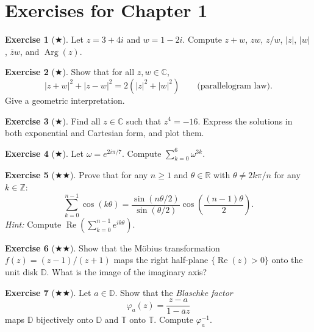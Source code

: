 \documentclass[12pt,a4paper,openany]{book}
\theoremstyle{definition}
\newtheorem{exercise}{Exercise}[chapter]
\theoremstyle{plain}
\theoremstyle{remark}
\newcommand{\C}{\mathbb{C}}
\newcommand{\R}{\mathbb{R}}
\newcommand{\Z}{\mathbb{Z}}
\newcommand{\D}{\mathbb{D}}
\newcommand{\T}{\mathbb{T}}
\DeclareMathOperator{\re}{Re}
\DeclareMathOperator{\Arg}{Arg}
\newcommand{\abs}[1]{\left|#1\right|}
\newcommand{\conj}[1]{\overline{#1}}
\begin{document}
\section{Exercises for Chapter 1}
\label{sec:exercises-ch1}

\begin{exercise}[$\bigstar$]
\label{exo:ch1-1}
Let $z=3+4i$ and $w=1-2i$. Compute $z+w$, $zw$, $z/w$, $\abs{z}$, $\abs{w}$, $\conj{z}w$, and $\Arg(z)$.
\end{exercise}

\begin{exercise}[$\bigstar$]
\label{exo:ch1-2}
Show that for all $z,w\in\C$,
\[
  \abs{z+w}^2 + \abs{z-w}^2 = 2(\abs{z}^2+\abs{w}^2) \qquad\text{(parallelogram law)}.
\]
Give a geometric interpretation.
\end{exercise}

\begin{exercise}[$\bigstar$]
\label{exo:ch1-3}
Find all $z\in\C$ such that $z^4 = -16$. Express the solutions in both exponential and Cartesian form, and plot them.
\end{exercise}

\begin{exercise}[$\bigstar$]
\label{exo:ch1-4}
Let $\omega = e^{2i\pi/7}$. Compute $\displaystyle\sum_{k=0}^{6}\omega^{3k}$.
\end{exercise}

\begin{exercise}[$\bigstar\!\bigstar$]
\label{exo:ch1-5}
Prove that for any $n\geq 1$ and $\theta\in\R$ with $\theta\neq 2k\pi/n$ for any $k\in\Z$:
\[
  \sum_{k=0}^{n-1}\cos(k\theta) = \frac{\sin(n\theta/2)}{\sin(\theta/2)}\cos\!\left(\frac{(n-1)\theta}{2}\right).
\]
\textit{Hint:} Compute $\re\!\left(\sum_{k=0}^{n-1}e^{ik\theta}\right)$.
\end{exercise}

\begin{exercise}[$\bigstar\!\bigstar$]
\label{exo:ch1-6}
Show that the M\"obius transformation $f(z) = (z-1)/(z+1)$ maps the right half-plane $\{\re(z)>0\}$ onto the unit disk $\D$. What is the image of the imaginary axis?
\end{exercise}

\begin{exercise}[$\bigstar\!\bigstar$]
\label{exo:ch1-7}
Let $a\in\D$. Show that the \emph{Blaschke factor}
\[
  \varphi_a(z) = \frac{z-a}{1-\conj{a}z}
\]
maps $\D$ bijectively onto $\D$ and $\T$ onto $\T$. Compute $\varphi_a^{-1}$.
\end{exercise}
\end{document}
